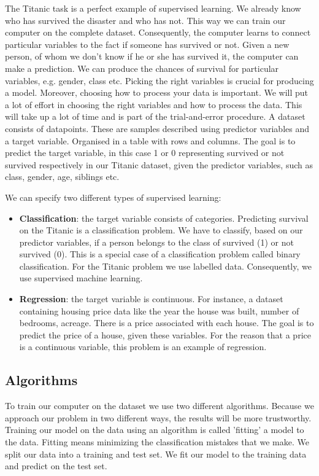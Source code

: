 \documentclass[11pt]{article}
\begin{document}
The Titanic task is a perfect example of supervised learning. We already know who has survived the disaster and who has not. This way we can train our computer on the complete dataset. Consequently, the computer learns to connect particular variables to the fact if someone has survived or not. Given a new person, of whom we don't know if he or she has survived it, the computer can make a prediction. We can produce the chances of survival for particular variables, e.g. gender, class etc. Picking the right variables is crucial for producing a model. Moreover, choosing how to process your data is important. We will put a lot of effort in choosing the right variables and how to process the data. This will take up a lot of time and is part of the trial-and-error procedure.
A dataset consists of datapoints. These are samples described using predictor variables and a target variable. Organised in a table with rows and columns. The goal is to predict the target variable, in this case 1 or 0 representing survived or not survived respectively in our Titanic dataset, given the predictor variables, such as class, gender, age, siblings etc. 

We can specify two different types of supervised learning: 
\begin{itemize}
\item \textbf{Classification}: the target variable consists of categories. Predicting survival on the Titanic is a classification problem. We have to classify, based on our predictor variables, if a person belongs to the class of survived (1) or not survived (0). This is a special case of a classification problem called binary classification. For the Titanic problem we use labelled data. Consequently, we use supervised machine learning.
\item \textbf{Regression}: the target variable is continuous. For instance, a dataset containing housing price data like the year the house was built, number of bedrooms, acreage. There is a price associated with each house. The goal is to predict the price of a house, given these variables. For the reason that a price is a continuous variable, this problem is an example of regression.
\end{itemize}


\subsection{Algorithms}
\label{sec:org71a2035}
To train our computer on the dataset we use two different algorithms. Because we approach our problem in two different ways, the results will be more trustworthy. Training our model on the data using an algorithm is called 'fitting' a model to the data. Fitting means minimizing the classification mistakes that we make. We split our data into a training and test set. We fit our model to the training data and predict on the test set. 
\end{document}
